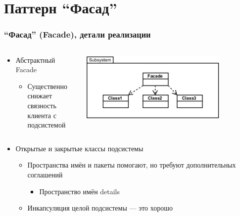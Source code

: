 \documentclass[xetex,mathserif,serif]{beamer}
\begin{document}
	\section{Паттерн ``Фасад''}

	\begin{frame}
		\frametitle{``Фасад'' (Facade), детали реализации}
		\begin{columns}
			\begin{column}{0.5\textwidth}
				\begin{itemize}
					\item Абстрактный Facade
					\begin{itemize}
						\item Существенно снижает связность клиента с подсистемой
					\end{itemize}
				\end{itemize}
			\end{column}
			\begin{column}{0.5\textwidth}
				\begin{center}
					\includegraphics[width=0.8\textwidth]{facade.png}
				\end{center}
			\end{column}
		\end{columns}
		\begin{itemize}
			\item Открытые и закрытые классы подсистемы
			\begin{itemize}
				\item Пространства имён и пакеты помогают, но требуют дополнительных соглашений
				\begin{itemize}
					\item Пространство имён details
				\end{itemize}
				\item Инкапсуляция целой подсистемы --- это хорошо
			\end{itemize}
		\end{itemize}
	\end{frame}
\end{document}
